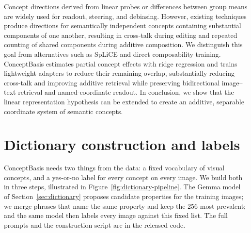 \documentclass[mlmain,onecolumn]{jmlr}
\begin{document}
Concept directions derived from linear probes or differences between group means are widely used for readout, steering, and debiasing. However, existing techniques produce directions for semantically independent concepts containing substantial components of one another, resulting in cross-talk during editing and repeated counting of shared components during additive composition. We distinguish this goal from alternatives such as SpLiCE and direct composability training. ConceptBasis estimates partial concept effects with ridge regression and trains lightweight adapters to reduce their remaining overlap, substantially reducing cross-talk and improving additive retrieval while preserving bidirectional image--text retrieval and named-coordinate readout. In conclusion, we show that the linear representation hypothesis can be extended to create an additive, separable coordinate system of semantic concepts.

\FloatBarrier


\appendix
\section{Dictionary construction and labels}
\label{apd:dictionary}

ConceptBasis needs two things from the data: a fixed vocabulary of visual concepts, and a yes-or-no label for every concept on every image. We build both in three steps, illustrated in Figure~\ref{fig:dictionary-pipeline}. The Gemma model of Section~\ref{sec:dictionary} proposes candidate properties for the training images; we merge phrases that name the same property and keep the 256 most prevalent; and the same model then labels every image against this fixed list. The full prompts and the construction script are in the released code.
\end{document}
